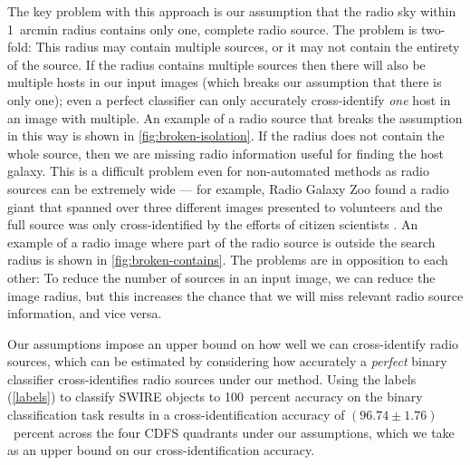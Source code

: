\documentclass[fleqn,usenatbib,usedcolumn]{mnras}
\begin{document}
    The key problem with this approach is our assumption that the radio sky
    within 1~arcmin radius contains only one, complete radio source. The problem
    is two-fold: This radius may contain multiple sources, or it may not contain
    the entirety of the source. If the radius contains multiple sources then
    there will also be multiple hosts in our input images (which breaks our
    assumption that there is only one); even a perfect classifier can only
    accurately cross-identify \emph{one} host in an image with multiple. An
    example of a radio source that breaks the assumption in this way is shown in
    \autoref{fig:broken-isolation}. If the radius does not contain the whole
    source, then we are missing radio information useful for finding the host
    galaxy. This is a difficult problem even for non-automated methods as radio
    sources can be extremely wide --- for example, Radio Galaxy Zoo found a
    radio giant that spanned over three different images presented to volunteers
    and the full source was only cross-identified by the efforts of citizen
    scientists \citep{banfield15}. An example of a radio image where part of the
    radio source is outside the search radius is shown in
    \autoref{fig:broken-contains}. The problems are in opposition to each other:
    To reduce the number of sources in an input image, we can reduce the image
    radius, but this increases the chance that we will miss relevant radio
    source information, and vice versa.

    Our assumptions impose an upper bound on how well we can cross-identify
    radio sources, which can be estimated by considering how accurately a
    \emph{perfect} binary classifier cross-identifies radio sources under our
    method. Using the \citet{norris06} labels (\autoref{labels}) to classify
    SWIRE objects to 100~percent accuracy on the binary classification task
    results in a cross-identification accuracy of $(96.74 \pm 1.76)$~percent
    across the four CDFS quadrants under our assumptions, which we take as an
    upper bound on our cross-identification accuracy.
\end{document}
